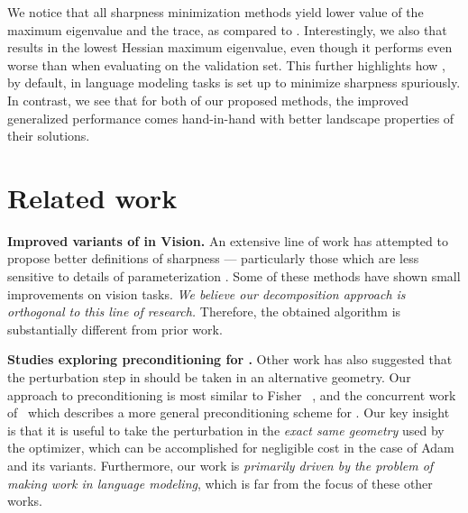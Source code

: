 We notice that all sharpness minimization methods yield lower value of the maximum eigenvalue and the trace, as compared to \adamw. Interestingly, we also that \SAM results in the lowest Hessian maximum eigenvalue, even though it performs even worse than \adamw when evaluating on the validation set. This further highlights how \SAM, by default, in language modeling tasks is set up to minimize sharpness spuriously. In contrast, we see that for both of our proposed methods, the improved generalized performance comes hand-in-hand with better landscape properties of their solutions. 

 










\section{Related work}

\textbf{Improved variants of \SAM in Vision.} An extensive line of work has attempted to propose better definitions of sharpness --- particularly those which are less sensitive to
details of parameterization
\citep{kwon2021asam,tahmasebi2024universalclasssharpnessawareminimization,li2024enhancing}. Some of these methods 
have shown small improvements on vision tasks. \textit{We believe our decomposition approach is orthogonal to this line of research.} Therefore, the obtained \funcSAM algorithm is substantially different from  prior work.



\textbf{Studies exploring preconditioning for \SAM.} Other work has also suggested that the perturbation step in \SAM should be taken in an alternative geometry. Our approach to preconditioning is most
similar to Fisher \SAM~\citep{kim2022fisher}, and the concurrent work of~\citet{zhang2025preconditioned} which describes a more
general preconditioning scheme for \SAM. Our key insight is that it is useful to take the \SAM perturbation in the \emph{exact same geometry}
used by the optimizer, which can be accomplished for negligible cost in the case of Adam and its variants.
Furthermore, our work is \textit{primarily driven by the problem of making \SAM work in language modeling}, which is far from the focus of these other works.

